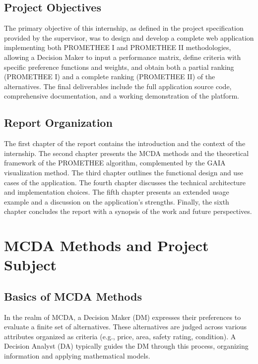 \documentclass[12pt,a4paper,oneside]{report}
\begin{document}
\section{Project Objectives}
The primary objective of this internship, as defined in the project specification provided by the supervisor, was to design and develop a complete web application implementing both PROMETHEE I and PROMETHEE II methodologies, allowing a Decision Maker to input a performance matrix, define criteria with specific preference functions and weights, and obtain both a partial ranking (PROMETHEE I) and a complete ranking (PROMETHEE II) of the alternatives. The final deliverables include the full application source code, comprehensive documentation, and a working demonstration of the platform.

\section{Report Organization}
The first chapter of the report contains the introduction and the context of the internship. The second chapter presents the MCDA methods and the theoretical framework of the PROMETHEE algorithm, complemented by the GAIA visualization method. The third chapter outlines the functional design and use cases of the application. The fourth chapter discusses the technical architecture and implementation choices. The fifth chapter presents an extended usage example and a discussion on the application's strengths. Finally, the sixth chapter concludes the report with a synopsis of the work and future perspectives.

\chapter{MCDA Methods and Project Subject}

\section{Basics of MCDA Methods}
In the realm of MCDA, a Decision Maker (DM) expresses their preferences to evaluate a finite set of alternatives. These alternatives are judged across various attributes organized as criteria (e.g., price, area, safety rating, condition). A Decision Analyst (DA) typically guides the DM through this process, organizing information and applying mathematical models. 
\end{document}
